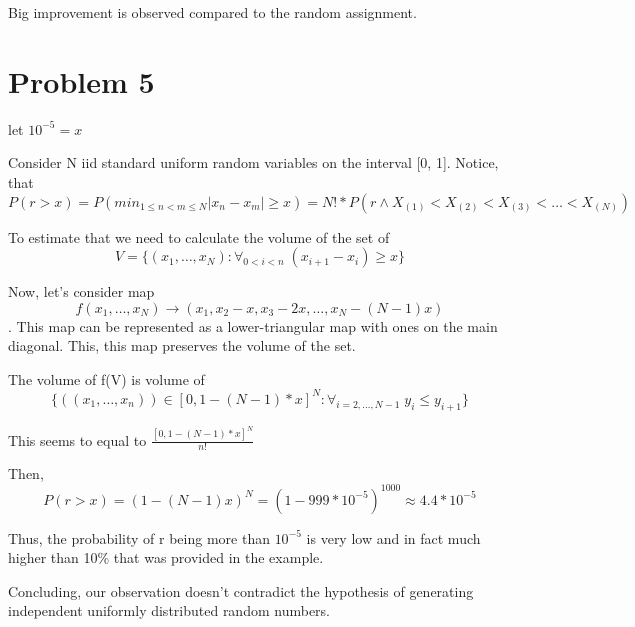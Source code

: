 \documentclass{article}
\begin{document}
Big improvement is observed compared to the random assignment.


\section{Problem 5}

let $10^{-5} = x$

Consider N iid standard uniform random variables on the interval [0, 1]. Notice, that \[ P(r > x) = P(min_{1 \le n < m \le N}|x_n - x_m| \ge x) = N! * P(r \land X_{(1)} < X_{(2)} < X_{(3)} < \dots < X_{(N)}) \]

To estimate that we need to calculate the volume of the set of \[ V =  \{(x_1, \dots, x_N): \forall_{0 < i < n} \; (x_{i+1} - x_{i}) \ge x\} \]

Now, let's consider map \[f (x_1, \dots, x_N) \rightarrow (x_1, x_2 - x, x_3 - 2x, \dots, x_N - (N-1)x) \]. This map can be represented as a lower-triangular map with ones on the main diagonal. This, this map preserves the volume of the set.

The volume of f(V) is volume of \[ \{((x_1, \dots, x_n)) \in [0, 1 - (N-1)*x]^N: \forall_{i=2, \dots, N-1} \; y_i \le y_{i+1} \} \]

This seems to equal to $\frac{[0, 1 - (N-1)*x]^N}{n!}$

Then, \[ P(r > x) = (1-(N-1)x)^{N} = (1 - 999*10^{-5})^{1000} \approx 4.4*10^{-5} \] 

Thus, the probability of r being more than $10^{-5}$ is very low and in fact much higher than 10\% that was provided in the example.  

Concluding, our observation doesn't contradict the hypothesis of generating independent uniformly distributed random numbers.
\end{document}
